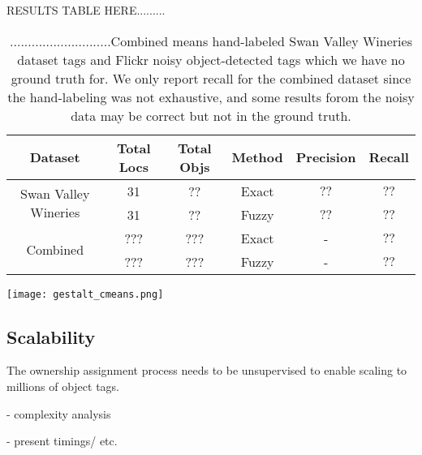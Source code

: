 RESULTS TABLE HERE.........
\begin{table}[h!]
	\begin{center}
		\begin{tabular}{ |c|c|c|c|c|c| } 
			\hline
			Dataset & Total Locs & Total Objs & Method & Precision & Recall \\
			\hline
			\multirow{2}{9em}{Swan Valley Wineries } 
                & 31 & ?? & Exact & $??$ & $??$  \\ 
			& 31 & ?? & Fuzzy & $??$ & $??$  \\ 
			\multirow{2}{9em}{Combined} 
                & ??? & ??? & Exact & - & $??$  \\ 
			& ??? & ??? & Fuzzy & - & $??$  \\ 
			\hline
		\end{tabular}
		\label{table:clustering}
		\caption{............................Combined means hand-labeled Swan Valley Wineries dataset tags and Flickr noisy object-detected tags which we have no ground truth for. We only report recall for the combined dataset since the hand-labeling was not exhaustive, and some results forom the noisy data may be correct but not in the ground truth.}
	\end{center}
\end{table}


\begin{figure*}[ht]
\label{fig:cmeans}        
\texttt{[image: gestalt\_cmeans.png]}
\centering
\caption[width=\textwidth]{............}
\end{figure*}


\subsection{Scalability}
The ownership assignment process needs to be unsupervised to enable scaling to millions of object tags. 

- complexity analysis

- present timings/ etc.







